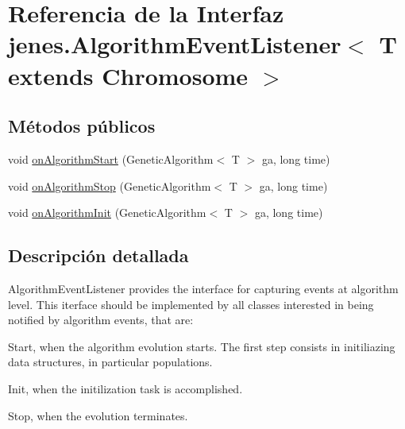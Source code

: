 \hypertarget{interfacejenes_1_1_algorithm_event_listener_3_01_t_01extends_01_chromosome_01_4}{\section{Referencia de la Interfaz jenes.\-Algorithm\-Event\-Listener$<$ T extends Chromosome $>$}
\label{interfacejenes_1_1_algorithm_event_listener_3_01_t_01extends_01_chromosome_01_4}
}
\subsection*{Métodos públicos}
\begin{DoxyCompactItemize}
\item 
void \hyperlink{interfacejenes_1_1_algorithm_event_listener_3_01_t_01extends_01_chromosome_01_4_af0d6e9961e685f4d44270a4feedeb70f}{on\-Algorithm\-Start} (Genetic\-Algorithm$<$ T $>$ ga, long time)
\item 
void \hyperlink{interfacejenes_1_1_algorithm_event_listener_3_01_t_01extends_01_chromosome_01_4_ab494ea60f6000ebcd02a94c7eda70dcf}{on\-Algorithm\-Stop} (Genetic\-Algorithm$<$ T $>$ ga, long time)
\item 
void \hyperlink{interfacejenes_1_1_algorithm_event_listener_3_01_t_01extends_01_chromosome_01_4_af5f6bb7f487c9ecd01331427a370889e}{on\-Algorithm\-Init} (Genetic\-Algorithm$<$ T $>$ ga, long time)
\end{DoxyCompactItemize}


\subsection{Descripción detallada}
{\ttfamily Algorithm\-Event\-Listener} provides the interface for capturing events at algorithm level. This iterface should be implemented by all classes interested in being notified by algorithm events, that are\-: 
\begin{DoxyItemize}
\item Start, when the algorithm evolution starts. The first step consists in initiliazing data structures, in particular populations. 
\item Init, when the initilization task is accomplished. 
\item Stop, when the evolution terminates. 
\end{DoxyItemize}

